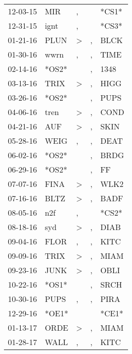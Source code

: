 \begin{supertabular}{lllll}
 12-03-15 &    MIR &                , &                  &  *CS1* \\
 12-31-15 &   ignt &                , &                  &  *CS3* \\
 01-21-16 &   PLUN &     \textgreater &                , &   BLCK \\
 01-30-16 &   wwrn &                , &                , &   TIME \\
 02-14-16 &  *OS2* &                  &                , &   1348 \\
 03-13-16 &   TRIX &     \textgreater &                , &   HIGG \\
 03-26-16 &  *OS2* &                  &                , &   PUPS \\
 04-06-16 &   tren &     \textgreater &                , &   COND \\
 04-21-16 &    AUF &     \textgreater &                , &   SKIN \\
 05-28-16 &   WEIG &                , &                , &   DEAT \\
 06-02-16 &  *OS2* &                  &                , &   BRDG \\
 06-29-16 &  *OS2* &                  &                , &     FF \\
 07-07-16 &   FINA &     \textgreater &                , &   WLK2 \\
 07-16-16 &   BLTZ &     \textgreater &                , &   BADF \\
 08-05-16 &    n2f &                , &                  &  *CS2* \\
 08-18-16 &    syd &     \textgreater &                , &   DIAB \\
 09-04-16 &   FLOR &                , &                , &   KITC \\
 09-09-16 &   TRIX &     \textgreater &                , &   MIAM \\
 09-23-16 &   JUNK &     \textgreater &                , &   OBLI \\
 10-22-16 &  *OS1* &                  &                , &   SRCH \\
 10-30-16 &   PUPS &                , &                , &   PIRA \\
 12-29-16 &  *OE1* &                  &                  &  *CE1* \\
 01-13-17 &   ORDE &     \textgreater &                , &   MIAM \\
 01-28-17 &   WALL &                , &                , &   KITC \\

\end{supertabular}
